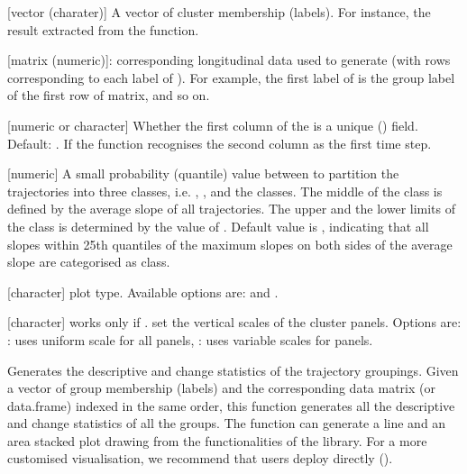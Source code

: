 \documentclass[a4paper]{book}
\begin{document}
\begin{Arguments}
\begin{ldescription}
\item[\code{clustr}] [vector (charater)] A vector of cluster membership (labels). For instance, the result extracted from the  function.

\item[\code{traj}] [matrix (numeric)]: corresponding longitudinal data used to generate  (with rows corresponding to each label of ). For example, the first label of  is the group label of the first row of  matrix, and so on.

\item[\code{id\_field}] [numeric or character] Whether the first column of the  is a unique () field. Default: . If  the function recognises the second column as the first time step.

\item[\code{bandw}] [numeric] A small probability (quantile) value between \code{[0,1]} to partition the trajectories into three classes, i.e. , , and the  classes. The middle of the  class is defined by the average slope of all trajectories. The upper and the lower limits of the  class is determined by the value of . Default value is , indicating that all slopes within 25th quantiles of the maximum slopes on both sides of the average slope are categorised as  class.

\item[\code{type}] [character] plot type. Available options are:  and .

\item[\code{y.scaling}] [character] works only if .  set the vertical scales of the cluster panels. Options are: : uses uniform scale for all panels, : uses variable scales for panels.
\end{ldescription}
\end{Arguments}
%
\begin{Details}\relax
Generates the descriptive and change statistics of the trajectory groupings. Given a vector of group membership (labels) and the corresponding data matrix (or data.frame) indexed in the same order, this function generates all the descriptive and change statistics of all the groups.
The function can generate a line and an area stacked plot drawing from the functionalities of the  library. For a more customised visualisation, we recommend that users deploy  directly ().
\end{Details}
\end{document}
